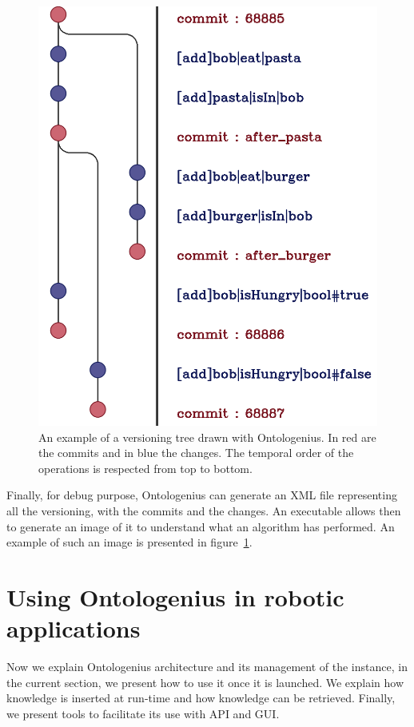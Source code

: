 \begin{figure}[ht!]
\centering
\includegraphics[scale=0.22]{figures/chapter2/commit.png}
\caption{\label{fig:chap2_commit} An example of a versioning tree drawn with Ontologenius. In red are the commits and in blue the changes. The temporal order of the operations is respected from top to bottom. }
\end{figure}

Finally, for debug purpose, Ontologenius can generate an XML file representing all the versioning, with the commits and the changes. An executable allows then to generate an image of it to understand what an algorithm has performed. An example of such an image is presented in figure~\ref{fig:chap2_commit}.

\section{Using Ontologenius in robotic applications}

Now we explain Ontologenius architecture and its management of the instance, in the current section, we present how to use it once it is launched. We explain how knowledge is inserted at run-time and how knowledge can be retrieved. Finally, we present tools to facilitate its use with API and GUI.

